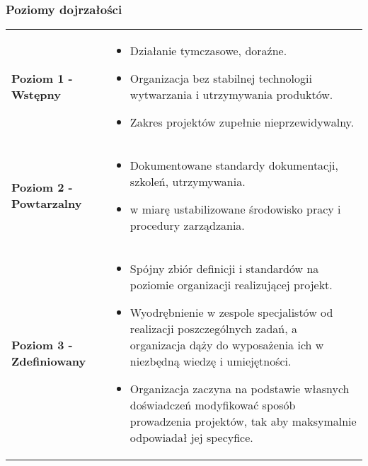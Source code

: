 \documentclass[../main.tex]{subfiles}
\begin{document}
    \subsubsection{Poziomy dojrzałości}
    \begin{table}[H]
        \begin{center}
            \begin{tabular}{ p{8cm} p{8cm} }
                \textbf{Poziom 1 - Wstępny}
                &
                \begin{itemize}
                    \item Działanie tymczasowe, doraźne.
                    \item Organizacja bez stabilnej technologii wytwarzania i utrzymywania produktów.
                    \item Zakres projektów zupełnie nieprzewidywalny.
                \end{itemize}
                \\

                \textbf{Poziom 2 - Powtarzalny}
                &
                \begin{itemize}
                    \item Dokumentowane standardy dokumentacji, szkoleń, utrzymywania.
                    \item w miarę ustabilizowane środowisko pracy i procedury zarządzania.
                \end{itemize}
                \\

                \textbf{Poziom 3 - Zdefiniowany}
                &
                \begin{itemize}
                    \item Spójny zbiór definicji i standardów na poziomie
                    organizacji realizującej projekt.
                    \item Wyodrębnienie w zespole specjalistów od realizacji
                    poszczególnych zadań, a organizacja dąży do wyposażenia ich
                    w niezbędną wiedzę i umiejętności.
                    \item Organizacja zaczyna na podstawie własnych doświadczeń
                    modyfikować sposób prowadzenia projektów, tak aby
                    maksymalnie odpowiadał jej specyfice.
                \end{itemize}
                \\


\end{tabular}
\end{center}
\end{table}
\end{document}
